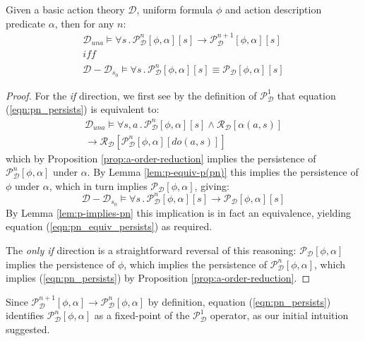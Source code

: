 \begin{thm}
Given a basic action theory $\mathcal{D}$, uniform formula $\phi$
and action description predicate $\alpha$, then for any $n$:\label{thm:p(pn)-equiv-p}\begin{gather}
\mathcal{D}_{una}\models\forall s\,.\,\mathcal{P}_{\mathcal{D}}^{n}[\phi,\alpha][s]\rightarrow\mathcal{P}_{\mathcal{D}}^{n+1}[\phi,\alpha][s]\label{eqn:pn_persists}\\
\mathit{iff}\nonumber \\
\mathcal{D}-\mathcal{D}_{s_{0}}\models\forall s\,.\,\mathcal{P}_{\mathcal{D}}^{n}[\phi,\alpha][s]\equiv\mathcal{P_{D}}[\phi,\alpha][s]\label{eqn:pn_equiv_persists}\end{gather}

\end{thm}
\begin{proof}
For the \emph{if} direction, we first see by the definition of $\mathcal{P}_{\mathcal{D}}^{1}$
that equation (\ref{eqn:pn_persists}) is equivalent to:\begin{multline*}
\mathcal{D}_{una}\models\forall s,a\,.\,\mathcal{P}_{\mathcal{D}}^{n}[\phi,\alpha][s]\wedge\mathcal{R}_{\mathcal{D}}[\alpha(a,s)]\\
\rightarrow\mathcal{R}_{\mathcal{D}}[\mathcal{P}_{\mathcal{D}}^{n}[\phi,\alpha][do(a,s)]]\end{multline*}
which by Proposition \ref{prop:a-order-reduction} implies the persistence
of $\mathcal{P}_{\mathcal{D}}^{n}[\phi,\alpha]$ under $\alpha$.
By Lemma \ref{lem:p-equiv-p(pn)} this implies the persistence of
$\phi$ under $\alpha$, which in turn implies $\mathcal{P_{D}}[\phi,\alpha]$,
giving:\[
\mathcal{D}-\mathcal{D}_{s_{0}}\models\forall s\,.\,\mathcal{P}_{\mathcal{D}}^{n}[\phi,\alpha][s]\rightarrow\mathcal{P_{D}}[\phi,\alpha][s]\]
By Lemma \ref{lem:p-implies-pn} this implication is in fact an equivalence,
yielding equation (\ref{eqn:pn_equiv_persists}) as required.

The \emph{only if} direction is a straightforward reversal of this
reasoning: $\mathcal{P_{D}}[\phi,\alpha]$ implies the persistence
of $\phi$, which implies the persistence of $\mathcal{P}_{\mathcal{D}}^{n}[\phi,\alpha]$,
which implies (\ref{eqn:pn_persists}) by Proposition \ref{prop:a-order-reduction}.
\end{proof}
Since $\mathcal{P}_{\mathcal{D}}^{n+1}[\phi,\alpha]\rightarrow\mathcal{P}_{\mathcal{D}}^{n}[\phi,\alpha]$
by definition, equation (\ref{eqn:pn_persists}) identifies $\mathcal{P}_{\mathcal{D}}^{n}[\phi,\alpha]$
as a fixed-point of the $\mathcal{P}_{\mathcal{D}}^{1}$ operator,
as our initial intuition suggested.


